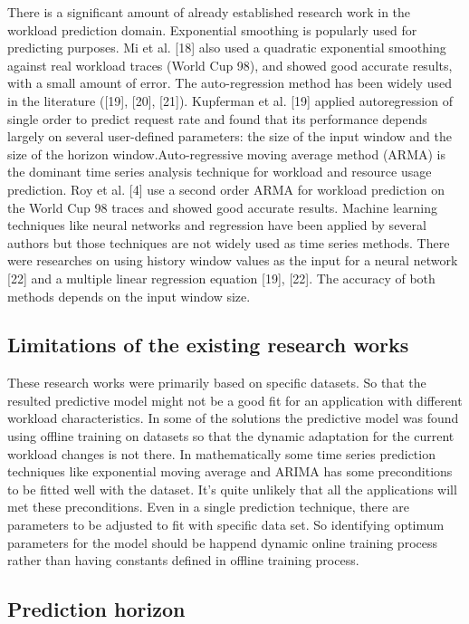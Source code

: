 There is a significant amount of already established research work in the workload prediction domain. Exponential smoothing is popularly used for predicting purposes. Mi et al. [18] also used a quadratic exponential smoothing against real workload traces (World Cup 98), and showed good accurate results, with a small amount of error. The auto-regression method has been widely used in the literature ([19], [20], [21]). Kupferman et al. [19] applied autoregression of single order to predict request rate and found that its performance depends largely on several user-defined parameters: the size of the input window and the size of the horizon window.Auto-regressive moving average method (ARMA) is the dominant time series analysis technique for workload and resource usage prediction. Roy et al. [4] use a second order ARMA for workload prediction on the World Cup 98 traces and showed good accurate results. Machine learning techniques like neural networks and regression have been applied by several authors but those techniques are not widely used as time series methods. There were researches on using history window values as the input for a neural network [22] and a multiple linear regression equation [19], [22]. The accuracy of both methods depends on the input window size.


\subsection{Limitations of the existing research works}

 These research works were primarily based on specific datasets. So that the resulted predictive model might not be a good fit for an application with different workload characteristics. In some of the solutions the predictive model was found using offline training on datasets so that the dynamic adaptation for the current workload changes is not there. 
In mathematically some time series prediction techniques like exponential moving average and ARIMA has some preconditions to be fitted well with the dataset. It’s quite unlikely that all the applications will met these preconditions. Even in a single prediction technique, there are parameters to be adjusted to fit with specific data set. So identifying optimum parameters for the model should be happend dynamic online training process rather than having constants defined in offline training process.


\subsection{Prediction horizon}

